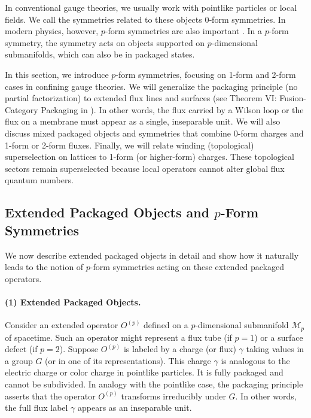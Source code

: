 \documentclass[12pt,a4paper]{article}
\begin{document}
In conventional gauge theories, we usually work with pointlike particles or local fields.
We call the symmetries related to these objects 0‑form symmetries.
In modern physics, however, $p$-form symmetries are also important \cite{Gaiotto2015,Polyakov1975,Luscher1980,Bali1995,Bali2001,Takahashi2002}.
In a $p$-form symmetry, the symmetry acts on objects supported on $p$-dimensional submanifolds, which can also be in packaged states.


In this section, 
we introduce $p$-form symmetries, focusing on 1-form and 2-form cases in confining gauge theories.
We will generalize the packaging principle (no partial factorization) to extended flux lines and surfaces (see Theorem VI: Fusion-Category Packaging in \cite{MaSPI2025}).
In other words, the flux carried by a Wilson loop or the flux on a membrane must appear as a single, inseparable unit.
We will also discuss mixed packaged objects and symmetries that combine 0-form charges and 1-form or 2-form fluxes.
Finally, we will relate winding (topological) superselection on lattices to 1-form (or higher-form) charges.
These topological sectors remain superselected because local operators cannot alter global flux quantum numbers.



\subsection{Extended Packaged Objects and $p$-Form Symmetries}


We now describe extended packaged objects in detail and show how it naturally leads to the notion of $p$-form symmetries acting on these extended packaged operators.


\paragraph{(1) Extended Packaged Objects.}
Consider an extended operator $O^{(p)}$ defined on a $p$-dimensional submanifold $\mathcal{M}_p$ of spacetime.\cite{Polchinski1995,Witten1995,Kitaev2006}
Such an operator might represent a flux tube (if $p=1$) or a surface defect (if $p=2$).
Suppose $O^{(p)}$ is labeled by a charge (or flux) $\gamma$ taking values in a group $G$ (or in one of its representations).
This charge $\gamma$ is analogous to the electric charge or color charge in pointlike particles.
It is fully packaged and cannot be subdivided.
In analogy with the pointlike case, the packaging principle asserts that the operator $O^{(p)}$ transforms irreducibly under $G$.
In other words, the full flux label $\gamma$ appears as an inseparable unit.
\end{document}
